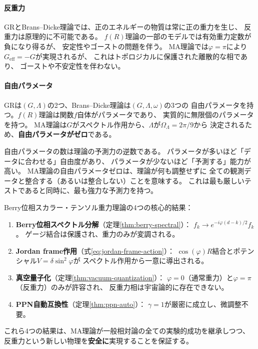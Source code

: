 \paragraph{反重力}
GRとBrans--Dicke理論では、正のエネルギーの物質は常に正の重力を生じ、
反重力は原理的に不可能である。
$f(R)$理論の一部のモデルでは有効重力定数が負になり得るが、
安定性やゴーストの問題を伴う。
MA理論では$\varphi = \pi$により$G_{\mathrm{eff}} = -G$が実現されるが、
これはトポロジカルに保護された離散的な相であり、
ゴーストや不安定性を伴わない。

\paragraph{自由パラメータ}
GRは$(G, \Lambda)$の2つ、Brans--Dicke理論は$(G, \Lambda, \omega)$の3つの
自由パラメータを持つ。$f(R)$理論は関数$f$自体がパラメータであり、
実質的に無限個のパラメータを持つ。
MA理論は$G$がスペクトル作用から、$\Lambda$が$\Omega_\Lambda = 2\pi/9$から
決定されるため、\textbf{自由パラメータがゼロ}である。

\begin{remark}
自由パラメータの数は理論の予測力の逆数である。
パラメータが多いほど「データに合わせる」自由度があり、
パラメータが少ないほど「予測する」能力が高い。
MA理論の自由パラメータゼロは、理論が何も調整せずに
全ての観測データと整合する（あるいは整合しない）ことを意味する。
これは最も厳しいテストであると同時に、最も強力な予測力を持つ。
\end{remark}

\begin{keyresult}
Berry位相スカラー・テンソル重力理論の4つの核心的結果：
\begin{enumerate}[label=\arabic*.]
\item \textbf{Berry位相スペクトル分解}（定理\ref{thm:berry-spectral}）：
  $f_k \to e^{-i\varphi(d-k)/2}f_k$。
  ゲージ結合は保護され、重力のみが変調される。
\item \textbf{Jordan frame作用}（式\ref{eq:jordan-frame-action}）：
  $\cos(\varphi)R$結合とポテンシャル$V = \delta\sin^2\varphi$が
  スペクトル作用から一意に導出される。
\item \textbf{真空量子化}（定理\ref{thm:vacuum-quantization}）：
  $\varphi = 0$（通常重力）と$\varphi = \pi$（反重力）のみが許容され、
  反重力相は宇宙論的に存在できない。
\item \textbf{PPN自動互換性}（定理\ref{thm:ppn-auto}）：
  $\gamma = 1$が厳密に成立し、微調整不要。
\end{enumerate}
これら4つの結果は、MA理論が一般相対論の全ての実験的成功を継承しつつ、
反重力という新しい物理を\textbf{安全に}実現することを保証する。
\end{keyresult}
